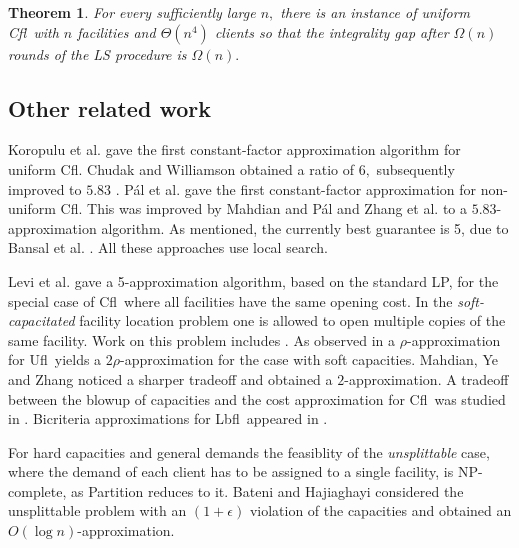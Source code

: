\documentclass[11pt]{article}\usepackage{amsmath}
\newtheorem{theorem}{Theorem}[section]
\newcommand{\lbfl}{{\sc Lbfl}}
\newcommand{\cfl}{{\sc Cfl}}
\newcommand{\ufl}{{\sc Ufl}}
\begin{document}
\begin{theorem}
\label{theorem:ls-cfl}
For every sufficiently large $n,$  
there is an instance of uniform \cfl \   with $n$ facilities and $\Theta(n^4)$ clients 
so that the integrality gap 
 after $\Omega(n)$ rounds of the LS procedure is  $\Omega(n).$  
\end{theorem}

 






\subsection{Other related work}
Koropulu et al. \cite{KoropuluPR00} gave the first constant-factor approximation
algorithm for uniform \cfl. Chudak and Williamson
\cite{ChudakW05} obtained a ratio of  $6,$ subsequently  improved to $5.83$
\cite{CharikarG99}.
 P\'{a}l et al. \cite{PalTW01} gave
the first constant-factor approximation for non-uniform \cfl. This was improved
by Mahdian and P\'{a}l \cite{MahdianP03} and Zhang et al. \cite{ZhangCY04} to a
$5.83$-approximation algorithm. As mentioned, the currently best guarantee is 5,
due  to Bansal et al. \cite{BansalGG12}. All these approaches use local search. 

Levi et al.  \cite{LeviSS12} gave a  5-approximation 
algorithm, based on the standard LP, for the special case of \cfl\ where
all facilities have the same opening cost. 
In the {\em soft-capacitated} facility location problem one is allowed to open
multiple copies of the same facility. 
Work on this problem 
includes \cite{ShmoysTA97,ChudakS99, ChudakW05, JainV01}.  
As observed in \cite{JainMMSV03}  a $\rho$-approximation for  \ufl\ yields a
$2\rho$-approximation for the case with soft capacities. Mahdian, Ye and Zhang
\cite{MahdianYZ03} noticed a sharper tradeoff and obtained a
$2$-approximation. A tradeoff between the blowup  of capacities and
the cost approximation for \cfl\ was studied in
\cite{AbramsMMP02}. Bicriteria approximations for \lbfl\  appeared in
\cite{KargerM00,GuhaMM00}. 

For hard capacities and general demands the feasiblity of the
{\em unsplittable} case, where the demand of each client has to be assigned to a
single facility, is NP-complete, as {\sc Partition} reduces to it. 
Bateni and Hajiaghayi \cite{BateniH12} considered the unsplittable problem 
with an $(1+\epsilon)$ violation of the capacities and obtained an
$O(\log n)$-approximation. 
\end{document}
